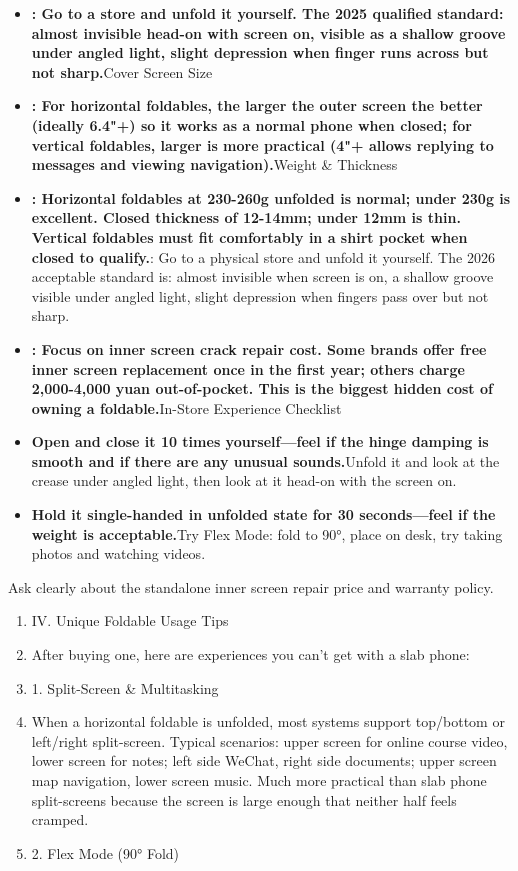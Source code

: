 \begin{itemize}
  \item \textbf{: Go to a store and unfold it yourself. The 2025 qualified standard: almost invisible head-on with screen on, visible as a shallow groove under angled light, slight depression when finger runs across but not sharp.}Cover Screen Size
  \item \textbf{: For horizontal foldables, the larger the outer screen the better (ideally 6.4"+) so it works as a normal phone when closed; for vertical foldables, larger is more practical (4"+ allows replying to messages and viewing navigation).}Weight \& Thickness
  \item \textbf{: Horizontal foldables at 230-260g unfolded is normal; under 230g is excellent. Closed thickness of 12-14mm; under 12mm is thin. Vertical foldables must fit comfortably in a shirt pocket when closed to qualify.}: Go to a physical store and unfold it yourself. The 2026 acceptable standard is: almost invisible when screen is on, a shallow groove visible under angled light, slight depression when fingers pass over but not sharp.
  \item \textbf{: Focus on inner screen crack repair cost. Some brands offer free inner screen replacement once in the first year; others charge 2,000-4,000 yuan out-of-pocket. This is the biggest hidden cost of owning a foldable.}In-Store Experience Checklist
  \item \textbf{Open and close it 10 times yourself—feel if the hinge damping is smooth and if there are any unusual sounds.}Unfold it and look at the crease under angled light, then look at it head-on with the screen on.
  \item \textbf{Hold it single-handed in unfolded state for 30 seconds—feel if the weight is acceptable.}Try Flex Mode: fold to 90°, place on desk, try taking photos and watching videos.
\end{itemize}

\begin{tcbpractice}{Ask clearly about the standalone inner screen repair price and warranty policy.}
\begin{enumerate}
  \item IV. Unique Foldable Usage Tips
  \item After buying one, here are experiences you can't get with a slab phone:
  \item 1. Split-Screen \& Multitasking
  \item When a horizontal foldable is unfolded, most systems support top/bottom or left/right split-screen. Typical scenarios: upper screen for online course video, lower screen for notes; left side WeChat, right side documents; upper screen map navigation, lower screen music. Much more practical than slab phone split-screens because the screen is large enough that neither half feels cramped.
  \item 2. Flex Mode (90° Fold)
\end{enumerate}

\end{tcbpractice}

